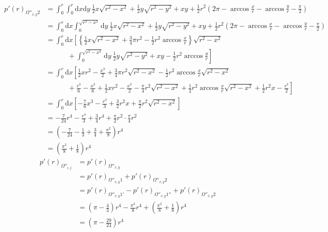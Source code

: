 \begin{align}
p'(r)_{\Omega''_{x, y}2} &= \int^{r}_{0}\int^{r}_{0}\mathrm{d}x\mathrm{d}y\ \frac{1}{2}x\sqrt{r^{2}-x^{2}} + \frac{1}{2}y\sqrt{r^{2} -y^{2}} + xy + \frac{1}{2}r^{2}\left( 2\pi - \arccos\frac{x}{r} - \arccos\frac{y}{r} - \frac{\pi}{2} \right)\nonumber \\
&= \int^{r}_{0}\mathrm{d}x\int^{\sqrt{r^{2}-x^{2}}}_{0}\mathrm{d}y\ \frac{1}{2}x\sqrt{r^{2}-x^{2}} + \frac{1}{2}y\sqrt{r^{2} -y^{2}} + xy + \frac{1}{2}r^{2}\left( 2\pi - \arccos\frac{x}{r} - \arccos\frac{y}{r} - \frac{\pi}{2} \right)\nonumber \\
&= \int^{r}_{0}\mathrm{d}x\left[ \left\{ \frac{1}{2}x\sqrt{r^{2}-x^{2}} + \frac{3}{4}\pi r^{2} - \frac{1}{2}r^{2}\arccos\frac{x}{r} \right\}\sqrt{r^{2}-x^{2}} \right. \nonumber \\
&\ \ \ \ \ \ \ \ \ \ \ \ \ \ + \left.  \int^{\sqrt{r^{2}-x^{2}}}_{0}\mathrm{d}y\ \frac{1}{2}y\sqrt{r^{2}-y^{2}} + xy - \frac{1}{2}r^{2}\arccos\frac{y}{r}\right]\nonumber \\
&= \int^{r}_{0}\mathrm{d}x\left[ \frac{1}{2}xr^{2} - \frac{x^{3}}{2} + \frac{3}{4}\pi r^{2}\sqrt{r^{2}-x^{2}} - \frac{1}{2}r^{2}\arccos \frac{x}{r} \sqrt{r^{2}-x^{2}} \right.\nonumber \\
&\ \ \ \ \ \ \ \ \ \ \ \ \ \ + \left. \frac{r^{3}}{6} - \frac{x^{3}}{6} + \frac{1}{2}xr^{2} - \frac{x^{3}}{2} - \frac{\pi}{4}r^{2}\sqrt{r^{2}-x^{2}} + \frac{1}{2}r^{2}\arccos\frac{x}{r}\sqrt{r^{2}-x^{2}} + \frac{1}{2}r^{2}x - \frac{r^{3}}{2}\right] \nonumber \\
&= \int^{r}_{0}\mathrm{d}x\left[- \frac{7}{6}x^{3} - \frac{r^{3}}{3} + \frac{3}{2}r^{2}x + \frac{\pi}{2}r^{2}\sqrt{r^{2}-x^{2}} \right]\nonumber \\
&= -\frac{7}{24}r^{4} - \frac{r^{4}}{3} + \frac{3}{4}r^{4} + \frac{\pi}{2}r^{2}\cdot \frac{\pi}{4}r^{2}\nonumber \\
&= \left( - \frac{7}{24} - \frac{1}{3} + \frac{3}{4} + \frac{\pi^{2}}{8}\right)r^{4}\nonumber \\
&= \left( \frac{\pi^{2}}{8} + \frac{1}{8} \right)r^{4}
\end{align}
\begin{align}
p'(r)_{\Omega''_{i,j}} &= p'(r)_{\Omega''_{x, y}}\nonumber \\
&= p'(r)_{\Omega''_{x, y}1}  +p'(r)_{\Omega''_{x, y}2}\nonumber \\
&= p'(r)_{\Omega''_{x, y}1'} - p'(r)_{\Omega''_{x, y}1''} + p'(r)_{\Omega''_{x, y}2}\nonumber \\
&= \left(\pi -\frac{4}{3}\right)r^{4} - \frac{\pi^{2}}{8}r^{4} + \left( \frac{\pi^{2}}{8} + \frac{1}{8} \right)r^{4}\nonumber \\
&= \left(\pi -\frac{29}{24}\right)r^{4}
\end{align}

